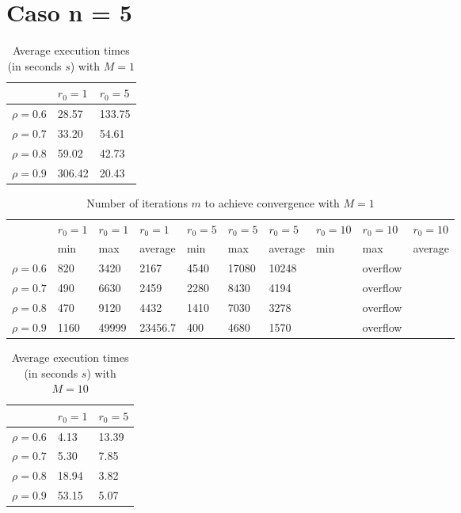 \documentclass[a4paper,11pt,openright]{report}
\begin{document}
\section*{Caso n = 5} 
\begin{table}[H]
\centering
\addtolength{\leftskip}{-1.5cm}
\addtolength{\rightskip}{-1.5cm}
\begin{tabular}{|c|ll|}
\hline
$ $ & $r_0 = 1$ & $r_0 = 5$ \\
\hline
$\rho = 0.6$ & 28.57 & 133.75 \\

$\rho = 0.7$ & 33.20 & 54.61 \\

$\rho = 0.8$ & 59.02 & 42.73 \\

$\rho = 0.9$ &  306.42 & 20.43 \\
\hline
\end{tabular}
\caption{Average execution
 times (in seconds $s$) with $M = 1$}
\end{table}
\begin{table}[H]
\centering
\addtolength{\leftskip}{-1.5cm}
\addtolength{\rightskip}{-1.5cm}
\begin{tabular}{|c|lllllllll|}
\hline
$ $ & $r_0 = 1$ & $r_0 = 1$ & $r_0 = 1$ & $r_0 = 5$ & $r_0 = 5$ & $r_0 = 5$ & $r_0 = 10$ & $r_0 = 10$ & $r_0 = 10$  \\
$ $ & min & max & average & min & max & average & min & max & average \\ 
\hline
$\rho = 0.6$ & 820 & 3420 & 2167 & 4540 & 17080 & 10248 &  & overflow &  \\

$\rho = 0.7$ & 490 & 6630 & 2459 & 2280 & 8430 & 4194 &  & overflow &  \\

$\rho = 0.8$ & 470 & 9120 & 4432 & 1410 & 7030 & 3278 &  & overflow & \\

$\rho = 0.9$ & 1160 & 49999 & 23456.7 & 400 & 4680 & 1570 &  & overflow & \\
\hline
\end{tabular}
\caption{Number of iterations $m$ to achieve convergence with $M = 1$}
\end{table}
\begin{table}[H]
\centering
\addtolength{\leftskip}{-1.5cm}
\addtolength{\rightskip}{-1.5cm}
\begin{tabular}{|c|ll|}
\hline
$ $ & $r_0 = 1$ & $r_0 = 5$ \\
\hline
$\rho = 0.6$ & 4.13 & 13.39 \\

$\rho = 0.7$ & 5.30 & 7.85  \\

$\rho = 0.8$ & 18.94 & 3.82 \\

$\rho = 0.9$ & 53.15 & 5.07 \\
\hline
\end{tabular}
\caption{Average execution
 times (in seconds $s$) with $M = 10$}
\end{table}
\end{document}
